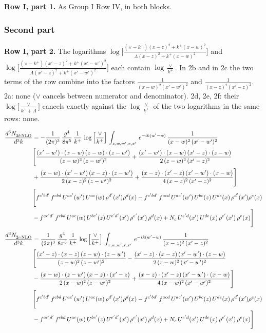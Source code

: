 \documentclass[9pt]{article}
\numberwithin{equation}{section}
\begin{document}
\textbf{Row I, part 1.} As Group I Row IV, in both blocks.
\subsubsection{Second part}
\textbf{Row I, part 2.} The logarithms $\log\Big[\frac{(\vee-k^{+})(x-z)^{2}+k^{+}(x-w)^{2}}{\Lambda(x-z)^{2}+k^{+}(x-w)^{2}}\Big]$ and $\log\Big[\frac{(\vee-k^{+})(x'-z)^{2}+k^{+}(x'-w')^{2}}{\Lambda(x'-z)^{2}+k^{+}(x'-w')^{2}}\Big]$ each contain $\log\frac{\vee}{k^+}$. In 2b and in 2c the two terms of the row combine into the factors $\frac{1}{(x-w)^2(x'-w')^2}$ and $\frac{1}{(x-z)^2(x'-z)^2}$. 2a: none ($\vee$ cancels between numerator and denominator). 2d, 2e, 2f: their $\log\big[\frac{\vee}{k^++\Lambda}\big]$ cancels exactly against the $\log\frac{\vee}{k^+}$ of the two logarithms in the same rows: none.

\begin{align}
\frac{d^{3}N_{2b\,\rm NLO}^{\rm}}{d^{3}k}  & = -\frac{1}{(2\pi)^{3}}\, \frac{g^{4}}{8\pi^{5}}\,\frac{1}{k^{+}}\,\log{\left[\frac{\vee}{k^{+}}\right]}\,\int_{z,w,w^{\prime},x,x'}\, e^{-ik(w^{\prime}-w)}\, \frac{1}{(x-w)^{2}\,(x'-w')^{2}} \notag \\
& \Bigg[\frac{(x'-w')\cdot (x-w)\, (z-w)\cdot (z-w')}{(z-w)^{2}\, (z-w')^{2}}+\frac{(x'-w')\cdot (x-w)\, (x'-z)\cdot (z-w)}{2\, (z-w)^{2}\, (x'-z)^{2}}\notag \\
& +\frac{(x-w)\cdot (x'-w')\, (x-z)\cdot (z-w')}{2\, (x-z)^{2}\, (z-w')^{2}}+\frac{(x-z)\cdot (x'-z)\, (x'-w')\cdot (x-w)}{4\, (x-z)^{2}\, (x'-z)^{2}}\Bigg]\notag \\
& \Bigg[f^{c'bd'}\,f^{cbd}\, U^{ac'}(w')\,U^{ac}(w)\,\rho^{d'}(x')\rho^{d}(x)- f^{c'bd'}\,f^{acd}\,U^{ac'}(w')\,U^{bc}(z)\,U^{de}(x)\,\rho^{d'}(x')\rho^{e}(x)\notag \\
& -f^{ac'd'}\,f^{cbd}\,U^{ac}(w)\,U^{bc'}(z)\,U^{e'd'}(x')\,\rho^{e'}(x')\,\rho^{d}(x) +N_{c}\,U^{e'd}(x')\,U^{de}(x)\,\rho^{e'}(x')\,\rho^{e}(x)\Bigg]
\end{align}
\begin{align}
\frac{d^{3}N_{2c\,\rm NLO}^{\rm}}{d^{3}k}  & = \frac{1}{(2\pi)^{3}}\, \frac{g^{4}}{8\pi^{5}}\,\frac{1}{k^{+}}\,\log{\left[\frac{\vee}{k^{+}}\right]}\,\int_{z,w,w^{\prime},x,x'}\, e^{-ik(w^{\prime}-w)}\, \frac{1}{(x-z)^{2}\,(x'-z)^{2}} \notag \\
& \Bigg[\frac{(x'-z)\cdot (x-z)\, (z-w)\cdot (z-w')}{(z-w)^{2}\, (z-w')^{2}}-\frac{(x'-z)\cdot (x-z)\, (x'-w')\cdot (z-w)}{2\, (z-w)^{2}\, (x'-w')^{2}}\notag \\
& -\frac{(x-w)\cdot (z-w')\, (x-z)\cdot (x'-z)}{2\, (x-w)^{2}\, (z-w')^{2}}+\frac{(x-z)\cdot (x'-z)\, (x'-w')\cdot (x-w)}{4\, (x-w)^{2}\, (x'-w')^{2}}\Bigg]\notag \\
& \Bigg[f^{c'bd'}\,f^{cbd}\, U^{ac'}(w')\,U^{ac}(w)\,\rho^{d'}(x')\rho^{d}(x)- f^{c'bd'}\,f^{acd}\,U^{ac'}(w')\,U^{bc}(z)\,U^{de}(x)\,\rho^{d'}(x')\rho^{e}(x)\notag \\
& -f^{ac'd'}\,f^{cbd}\,U^{ac}(w)\,U^{bc'}(z)\,U^{e'd'}(x')\,\rho^{e'}(x')\,\rho^{d}(x) +N_{c}\,U^{e'd}(x')\,U^{de}(x)\,\rho^{e'}(x')\,\rho^{e}(x)\Bigg]
\end{align}
\end{document}
